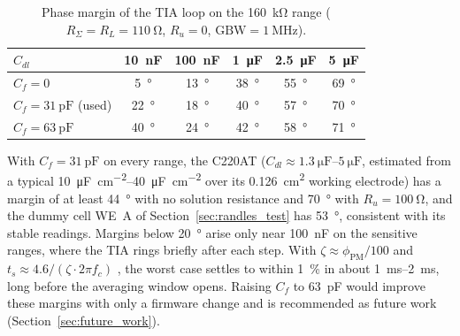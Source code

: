 \begin{table}[htbp]
  \centering
  \caption{Phase margin of the TIA loop on the \SI{160}{\kilo\ohm} range
    ($R_\Sigma = R_L = \SI{110}{\ohm}$, $R_u = 0$,
    $\mathrm{GBW} = \SI{1}{\mega\hertz}$).}
  \label{tab:pm}
  \small
  \begin{tabular}{@{}lccccc@{}}
    \toprule
    $C_{dl}$ & \SI{10}{\nano\farad} & \SI{100}{\nano\farad} & \SI{1}{\micro\farad} & \SI{2.5}{\micro\farad} & \SI{5}{\micro\farad} \\
    \midrule
    $C_f = 0$                    & \SI{5}{\degree}  & \SI{13}{\degree} & \SI{38}{\degree} & \SI{55}{\degree} & \SI{69}{\degree} \\
    $C_f = \SI{31}{\pico\farad}$ (used) & \SI{22}{\degree} & \SI{18}{\degree} & \SI{40}{\degree} & \SI{57}{\degree} & \SI{70}{\degree} \\
    $C_f = \SI{63}{\pico\farad}$ & \SI{40}{\degree} & \SI{24}{\degree} & \SI{42}{\degree} & \SI{58}{\degree} & \SI{71}{\degree} \\
    \bottomrule
  \end{tabular}
\end{table}

With $C_f = \SI{31}{\pico\farad}$ on every range, the C220AT ($C_{dl} \approx \SIrange{1.3}{5}{\micro\farad}$, estimated from a typical \SIrange{10}{40}{\micro\farad\per\centi\metre\squared} \cite[Sec.~1.2]{bard2001} over its \SI{0.126}{\centi\metre\squared} working electrode) has a margin of at least \SI{44}{\degree} with no solution resistance and \SI{70}{\degree} with $R_u = \SI{100}{\ohm}$, and the dummy cell WE~A of Section~\ref{sec:randles_test} has \SI{53}{\degree}, consistent with its stable readings. Margins below \SI{20}{\degree} arise only near \SI{100}{\nano\farad} on the sensitive ranges, where the TIA rings briefly after each step. With $\zeta \approx \phi_\mathrm{PM}/100$ and $t_s \approx 4.6/(\zeta \cdot 2\pi f_c)$ \cite{c2}, the worst case settles to within \SI{1}{\percent} in about \SIrange{1}{2}{\milli\second}, long before the averaging window opens. Raising $C_f$ to \SI{63}{\pico\farad} would improve these margins with only a firmware change and is recommended as future work (Section~\ref{sec:future_work}).